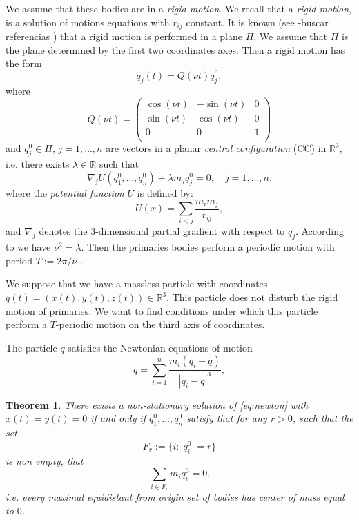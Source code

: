 \documentclass[twoside]{article}
\newtheorem{thm}{Theorem}[section]
\theoremstyle{remark}
\newcommand{\rr}{\mathbb{R}}
\begin{document}
We assume that these bodies are in a \emph{rigid motion}. We recall that a \emph{rigid  motion}, is a solution of motions equations with $r_{ij}$ constant.  It is known (see -buscar referencias ) that a rigid motion is performed in a plane $\Pi$. We assume that $\Pi$ is the plane determined by the first two coordinates axes. Then a rigid motion has the form
\[q_j(t)=Q(\nu t)q^0_j,\]
where
\[
 Q(\nu t)=\begin{pmatrix}
           \cos(\nu t) & -\sin(\nu t) & 0\\
           \sin(\nu t) & \cos(\nu t) & 0\\
           0            &     0     &  1\\
          \end{pmatrix}
\]
and $q^0_j\in\Pi$, $j=1,\ldots,n$ are vectors in a planar \emph{central configuration} (CC) in $\rr^3$, i.e. there exists $\lambda\in\rr$ such that
\[ \nabla_jU(q^0_1,\ldots,q^0_n)+\lambda m_jq^0_j=0,\quad j=1,\ldots,n.\]
where the \emph{potential function} $U$ is defined by:
\begin{equation}\label{eq:potencial}
 U(x)=\sum_{i<j}\frac{m_im_j}{r_{ij}},
\end{equation}
and $\nabla_j$ denotes the $3$-dimensional partial gradient with respect to $q_j$.
According to \cite[Eq. (2.16)]{JaumeLlibre276} we have $\nu^2=\lambda$. Then the primaries bodies perform a periodic motion with period $T:=2\pi/\nu$ .

We suppose that we have a massless particle with coordinates $q(t)=(x(t),y(t),z(t))\in\rr^3$. This particle does not disturb the rigid motion of  primaries.  We want to find conditions under which this particle perform a $T$-periodic motion on the third axis of coordinates.

The particle $q$ satisfies the Newtonian equations of motion
\begin{equation}\label{eq:newton}
 \ddot{q}=\sum_{i=1}^n\frac{m_i(q_i-q)}{|q_i-q|^3},
\end{equation}




\begin{thm}\label{thm:prim} There exists a non-stationary  solution of \eqref{eq:newton} with $x(t)=y(t)=0$ if and only if $q^0_1,\ldots,q^ 0_n$ satisfy that for any $r>0$, such that the set
\[F_r:=\{i:|q_i^ 0|=r\}\]
is non empty, that
\begin{equation}\label{eq:suma0}\sum_{i\in F_r}m_iq_i^ 0=0.\end{equation}
i.e. every maximal equidistant from origin set of bodies has center of mass equal to $0$.
\end{thm}
\end{document}
